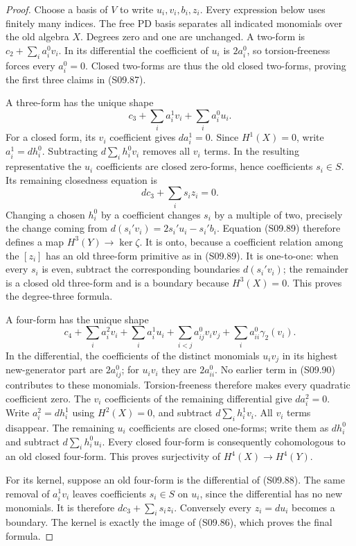 \begin{proof}
Choose a basis of $V$ to write $u_i,v_i,b_i,z_i$.
Every expression below uses finitely many indices.
The free PD basis separates all indicated monomials
over the old algebra $X$.  Degrees zero and one
are unchanged.  A two-form is
$c_2+\sum_i a_i^0v_i$.  In its differential the
coefficient of $u_i$ is $2a_i^0$, so torsion-freeness
forces every $a_i^0=0$.  Closed two-forms are thus
the old closed two-forms, proving the first three
claims in (S09.87).

A three-form has the unique shape
\[
                c_3+\sum_i a_i^1v_i+\sum_i a_i^0u_i.
 \tag{S09.88}
\]
For a closed form, its $v_i$ coefficient gives
$da_i^1=0$.  Since $H^1(X)=0$, write $a_i^1=dh_i^0$.
Subtracting $d\sum_i h_i^0v_i$ removes all $v_i$
terms.  In the resulting representative the
$u_i$ coefficients are closed zero-forms, hence
coefficients $s_i\in S$.  Its remaining closedness
equation is
\[
                      dc_3+\sum_i s_i z_i=0.         \tag{S09.89}
\]
Changing a chosen $h_i^0$ by a coefficient changes
$s_i$ by a multiple of two, precisely the change
coming from $d(s_i'v_i)=2s_i'u_i-s_i'b_i$.
Equation (S09.89) therefore defines a map
$H^3(Y)\to\ker\zeta$.
It is onto, because a coefficient relation among
the $[z_i]$ has an old three-form primitive as
in (S09.89).  It is one-to-one: when every $s_i$
is even, subtract the corresponding boundaries
$d(s_i'v_i)$; the remainder is a closed old
three-form and is a boundary because $H^3(X)=0$.
This proves the degree-three formula.

A four-form has the unique shape
\[
 c_4+\sum_i a_i^2v_i+\sum_i a_i^1u_i
       +\sum_{i<j}a_{ij}^0v_iv_j
       +\sum_i a_{ii}^0\gamma_2(v_i).               \tag{S09.90}
\]
In the differential, the coefficients of the
distinct monomials $u_iv_j$ in its highest new-generator
part are $2a_{ij}^0$; for $u_iv_i$ they are
$2a_{ii}^0$.  No earlier term in (S09.90)
contributes to these monomials.  Torsion-freeness
therefore makes every quadratic coefficient zero.
The $v_i$ coefficients of the remaining differential
give $da_i^2=0$.  Write $a_i^2=dh_i^1$ using
$H^2(X)=0$, and subtract $d\sum_i h_i^1v_i$.
All $v_i$ terms disappear.  The remaining
$u_i$ coefficients are closed one-forms; write
them as $dh_i^0$ and subtract $d\sum_i h_i^0u_i$.
Every closed four-form is consequently cohomologous
to an old closed four-form.  This proves surjectivity
of $H^4(X)\to H^4(Y)$.

For its kernel, suppose an old four-form is the
differential of (S09.88).  The same removal of
$a_i^1v_i$ leaves coefficients $s_i\in S$ on
$u_i$, since the differential has no new monomials.
It is therefore $dc_3+\sum_i s_i z_i$.
Conversely every $z_i=du_i$ becomes a boundary.
The kernel is exactly the image of (S09.86),
which proves the final formula.
\end{proof}

